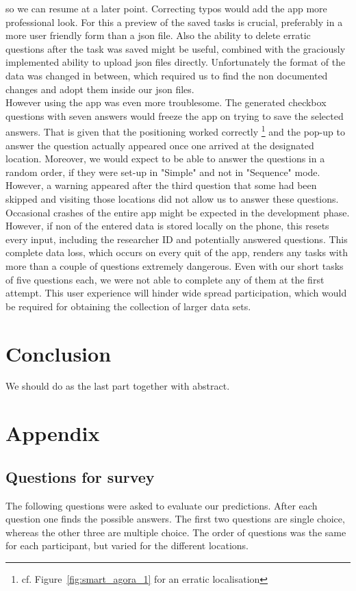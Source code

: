 \documentclass[letterpaper]{article}
\begin{document}
so we can resume at a later point. Correcting typos would add the app more professional look. For this a preview of the saved tasks is crucial, 
preferably in a more user friendly form than a json file. Also the ability to delete erratic questions after the task was saved 
might be useful, combined with the graciously implemented ability to upload json files directly. Unfortunately the format 
of the data was changed in between, which required us to find the non documented changes and adopt them inside our json files.\\
\indent However using the app was even more troublesome. The generated checkbox questions with seven answers would freeze 
the app on trying to save the selected answers. That is given that the positioning worked correctly
\footnote{cf. Figure~\ref{fig:smart_agora_1} for an erratic localisation} and the pop-up to answer the question actually 
appeared once one arrived at the designated location. Moreover, we would expect to be able to answer the questions in a random order, 
if they were set-up in "Simple" and not in "Sequence" mode. However, a warning appeared after the third question that some had been skipped 
and visiting those locations did not allow us to answer these questions.\\
\indent Occasional crashes of the entire app might be expected in the development phase. However, if non of the entered data 
is stored locally on the phone, this resets every input, including the researcher ID and potentially answered questions. 
This complete data loss, which occurs on every quit of the app, renders any tasks with more than a couple of questions extremely dangerous. 
Even with our short tasks of five questions each, we were not able to complete any of them at the first attempt. This user experience will 
hinder wide spread participation, which would be required for obtaining the collection of larger data sets.

\section{Conclusion}
We should do as the last part together with abstract.




\section{Appendix}
\subsection{Questions for survey}\label{app:questions}
The following questions were asked to evaluate our predictions. After each question one finds the possible answers. 
The first two questions are single choice, whereas the other three are multiple choice. 
The order of questions was the same for each participant, but varied for the different locations.
\end{document}
